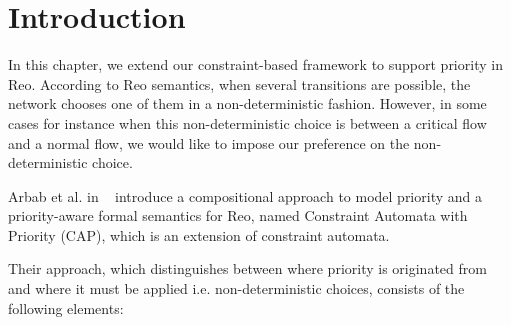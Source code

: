 \section{Introduction}
In this chapter, we extend our constraint-based framework to support priority in Reo. 
According to Reo semantics, when several transitions are possible, the network chooses one of them in a non-deterministic fashion. However, in some cases for instance when this non-deterministic choice is between a critical flow and a normal flow, we would like to impose our preference on the non-deterministic choice.  

%
%

Arbab et al. in ~\cite{priority} introduce a compositional approach to model priority and a priority-aware formal semantics for Reo, named Constraint Automata with Priority (CAP), which is an extension of constraint automata.

Their approach, which distinguishes between where priority is originated from and where it must be applied i.e. non-deterministic choices, consists of the following elements:

